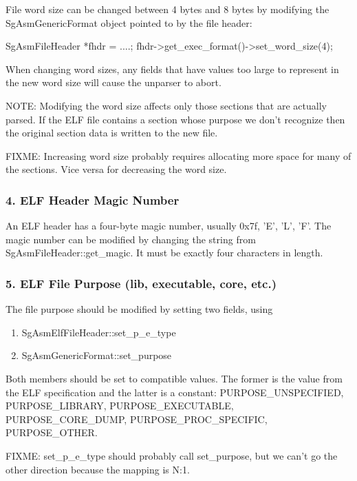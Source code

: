    File word size can be changed between 4 bytes and 8 bytes by modifying the SgAsmGenericFormat object pointed to by the file
   header:

      SgAsmFileHeader *fhdr = ....;
      fhdr->get\_exec\_format()->set\_word\_size(4);

   When changing word sizes, any fields that have values too large to represent in the new word size will cause the unparser
   to abort.

   NOTE: Modifying the word size affects only those sections that are actually parsed. If the ELF file contains a section whose
   purpose we don't recognize then the original section data is written to the new file.

   FIXME: Increasing word size probably requires allocating more space for many of the sections. Vice versa for decreasing the
   word size.
      
\subsubsection{4. ELF Header Magic Number}

   An ELF header has a four-byte magic number, usually 0x7f, 'E', 'L', 'F'.  The magic number can be modified by changing the
   string from SgAsmFileHeader::get\_magic.  It must be exactly four characters in length.

\subsubsection{5. ELF File Purpose (lib, executable, core, etc.)}

   The file purpose should be modified by setting two fields, using

\begin{enumerate}
      \item SgAsmElfFileHeader::set\_p\_e\_type
      \item SgAsmGenericFormat::set\_purpose
\end{enumerate}

   Both members should be set to compatible values. The former is the value from the ELF specification and the latter is a
   constant: PURPOSE\_UNSPECIFIED, PURPOSE\_LIBRARY, PURPOSE\_EXECUTABLE, PURPOSE\_CORE\_DUMP, PURPOSE\_PROC\_SPECIFIC, PURPOSE\_OTHER.

   FIXME: set\_p\_e\_type should probably call set\_purpose, but we can't go the other direction because the mapping is N:1.

